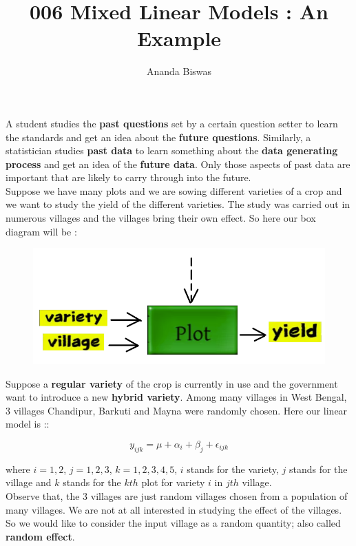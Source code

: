 \documentclass[11pt, a4paper]{article}\usepackage[]{graphicx}\usepackage[]{xcolor}
\title{006 Mixed Linear Models : An Example}
\author{Ananda Biswas}
\date{}
\begin{document}
\maketitle

A student studies the \textbf{past questions} set by a certain question setter to learn the standards and get an idea about the \textbf{future questions}. Similarly, a statistician studies \textbf{past data} to learn something about the \textbf{data generating process} and get an idea of the \textbf{future data}. Only those aspects of past data are important that are likely to carry through into the future. \\

Suppose we have many plots and we are sowing different varieties of a crop and we want to study the yield of the different varieties. The study was carried out in numerous villages and the villages bring their own effect. So here our box diagram will be :

\begin{figure}[h]
  \centering
  \includegraphics[scale = 0.5]{box_diagram}
\end{figure}

Suppose a \textbf{regular variety} of the crop is currently in use and the government want to introduce a new \textbf{hybrid variety}. Among many villages in West Bengal, 3 villages Chandipur, Barkuti and Mayna were randomly chosen. Here our linear model is ::

$$y_{ijk} = \mu + \alpha_i + \beta_j + \epsilon_{ijk}$$

where $i = 1, 2$, $j = 1, 2, 3$, $k = 1, 2, 3, 4, 5$, $i$ stands for the variety, $j$ stands for the village and $k$ stands for the $kth$ plot for variety $i$ in $jth$ village. \\

Observe that, the 3 villages are just random villages chosen from a population of many villages. We are not at all interested in studying the effect of the villages. So we would like to consider the input village as a random quantity; also called \textbf{random effect}. \\
\end{document}
